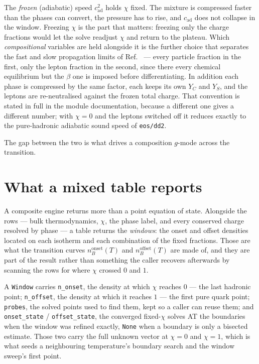 \documentclass[aps,prc,onecolumn,superscriptaddress,nofootinbib,10pt]{revtex4-2}
\newcommand{\nB}{n_B}
\begin{document}
The \emph{frozen} (adiabatic) speed $c_{\mathrm{ad}}^2$ holds $\chi$ fixed.
The mixture is compressed faster than the phases can convert, the pressure has
to rise, and $c_{\mathrm{ad}}$ does not collapse in the window. Freezing
$\chi$ is the part that matters: freezing only the charge fractions would let
the solve readjust $\chi$ and return to the plateau. Which \emph{compositional}
variables are held alongside it is the further choice that separates the fast
and slow propagation limits of Ref.~\cite{Constantinou2025} --- every particle
fraction in the first, only the lepton fraction in the second, since there
every chemical equilibrium but the $\beta$ one is imposed before
differentiating. In addition each phase is
compressed by the same factor, each keeps its own $Y_C$ and $Y_S$, and the
leptons are re-neutralised against the frozen total charge. That convention is
stated in full in the module documentation, because a different one gives a
different number; with $\chi = 0$ and the leptons switched off it reduces
exactly to the pure-hadronic adiabatic sound speed of \texttt{eos/dd2}.

The gap between the two is what drives a composition $g$-mode across the
transition.

\section{What a mixed table reports}

A composite engine returns more than a point equation of state. Alongside the
rows --- bulk thermodynamics, $\chi$, the phase label, and every conserved
charge resolved by phase --- a table returns the \emph{windows}: the onset and
offset densities located on each isotherm and each combination of the fixed
fractions. Those are what the transition curves $\nB^{\mathrm{onset}}(T)$ and
$\nB^{\mathrm{offset}}(T)$ are made of, and they are part of the result rather
than something the caller recovers afterwards by scanning the rows for where
$\chi$ crossed $0$ and $1$.

A \texttt{Window} carries \texttt{n\_onset}, the density at which $\chi$
reaches $0$ --- the last hadronic point; \texttt{n\_offset}, the density at
which it reaches $1$ --- the first pure quark point; \texttt{probes}, the
solved points used to find them, kept so a caller can reuse them; and
\texttt{onset\_state} / \texttt{offset\_state}, the converged fixed-$\chi$
solves AT the boundaries when the window was refined exactly, \texttt{None}
when a boundary is only a bisected estimate. Those two carry the full unknown
vector at $\chi = 0$ and $\chi = 1$, which is what seeds a neighbouring
temperature's boundary search and the window sweep's first point.
\end{document}
